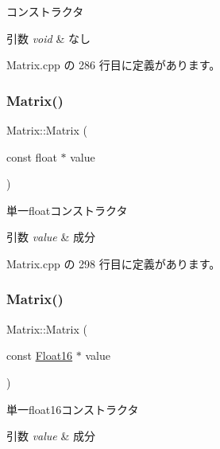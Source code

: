 コンストラクタ 


\begin{DoxyParams}{引数}
{\em void} & なし \\
\hline
\end{DoxyParams}


 Matrix.\+cpp の 286 行目に定義があります。

\mbox{\label{class_matrix_aec226891d64369eb1a1051ad96bf03da}} 
\subsubsection{\texorpdfstring{Matrix()}{Matrix()}\hspace{0.1cm}{\footnotesize\ttfamily [2/5]}}
{\footnotesize\ttfamily Matrix\+::\+Matrix (\begin{DoxyParamCaption}\item[{const float $\ast$}]{value }\end{DoxyParamCaption})}



単一floatコンストラクタ 


\begin{DoxyParams}{引数}
{\em value} & 成分 \\
\hline
\end{DoxyParams}


 Matrix.\+cpp の 298 行目に定義があります。

\mbox{\label{class_matrix_acf565e5e85611da8b1559604021fa71e}} 
\subsubsection{\texorpdfstring{Matrix()}{Matrix()}\hspace{0.1cm}{\footnotesize\ttfamily [3/5]}}
{\footnotesize\ttfamily Matrix\+::\+Matrix (\begin{DoxyParamCaption}\item[{const \mbox{\hyperlink{_vector3_d_8h_afe61185afc2bf3856c12613d99eede01}{Float16}} $\ast$}]{value }\end{DoxyParamCaption})}



単一float16コンストラクタ 


\begin{DoxyParams}{引数}
{\em value} & 成分 \\
\hline
\end{DoxyParams}


